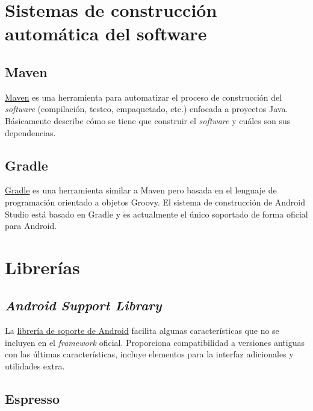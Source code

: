 \section{Sistemas de construcción automática del
software}\label{sistemas-de-construccion-automuxe1tica-del-software}

\subsection{Maven}\label{maven}

\href{https://maven.apache.org/}{Maven} es una herramienta para
automatizar el proceso de construcción del \emph{software} (compilación,
testeo, empaquetado, etc.) enfocada a proyectos Java. Básicamente
describe cómo se tiene que construir el \emph{software} y cuáles son sus
dependencias.

\subsection{Gradle}\label{gradle}

\href{https://gradle.org/}{Gradle} es una herramienta similar a Maven
pero basada en el lenguaje de programación orientado a objetos Groovy.
El sistema de construcción de Android Studio está basado en Gradle y es
actualmente el único soportado de forma oficial para Android.

\section{Librerías}\label{libreruxedas}

\subsection{\texorpdfstring{\emph{Android Support
Library}}{Android Support Library}}\label{android-support-library}

La
\href{https://developer.android.com/topic/libraries/support-library/}{librería
de soporte de Android} facilita algunas características que no se
incluyen en el \emph{framework} oficial. Proporciona compatibilidad a
versiones antiguas con las últimas características, incluye elementos
para la interfaz adicionales y utilidades extra.

\subsection{Espresso}\label{espresso}

